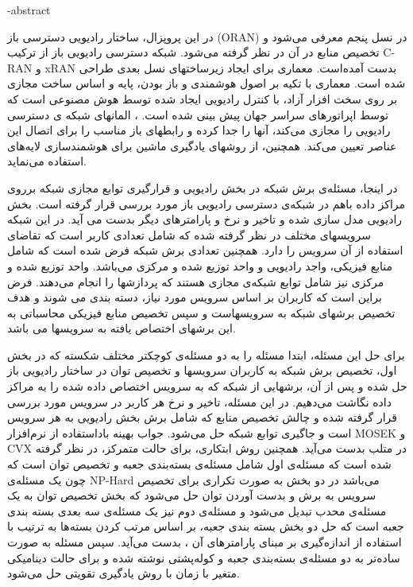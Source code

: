 \fa-abstract{
در این پروپزال، ساختار رادیویی دسترسی باز (ORAN) در نسل پنجم معرفی می‌شود و تخصیص منابع در آن در نظر گرفته می‌شود.
شبکه دسترسی رادیویی باز از ترکیب C-RAN و xRAN بدست آمده‌است. معماری  برای ایجاد زیرساختهای  نسل بعدی طراحی شده است.
معماری  با تکیه بر اصول هوشمندی و باز بودن، پایه و اساس ساخت  مجازی بر روی سخت افزار آزاد، با کنترل رادیویی ایجاد شده توسط هوش مصنوعی است که توسط اپراتورهای سراسر جهان پیش بینی شده است.
،
المانهای شبکه ی دسترسی رادیویی را مجازی می‌کند، آنها را جدا کرده و رابطهای باز مناسب را 
برای اتصال این عناصر
تعیین می‌کند. همچنین، 
از روشهای یادگیری ماشین برای هوشمندسازی لایه‌های 
استفاده می‌نماید.

در اینجا، مسئله‌ی برش شبکه در بخش رادیویی و قرارگیری توابع مجازی شبکه برروی مراکز داده باهم در شبکه‌ی دسترسی رادیویی باز مورد بررسی قرار گرفته است. 
بخش رادیویی
 مدل سازی شده و تاخیر و نرخ و پارامترهای دیگر بدست می آید. 
در این شبکه سرویسهای مختلف در نظر گرفته شده که شامل تعدادی کاربر است که تقاضای استفاده از آن سرویس را دارد. همچنین تعدادی برش شبکه فرض شده است که شامل منابع فیزیکی، واجد رادیویی و واحد توزیع شده و مرکزی می‌باشد. واحد توزیع شده و مرکزی نیز شامل توابع شبکه‌ی مجازی هستند که پردازشها را انجام می‌دهند.
فرض براین است که کاربران بر اساس سرویس مورد نیاز، دسته بندی می شوند و هدف تخصیص برشهای شبکه به سرویسهاست و سپس تخصیص منابع فیزیکی محاسباتی به این برشهای اختصاص یافته به سرویسها می باشد.
 
برای حل این مسئله، ابتدا مسئله را به دو مسئله‌ی کوچکتر مختلف شکسته که در بخش اول، تخصیص برش شبکه به کاربران سرویسها و تخصیص توان در ساختار رادیویی باز حل شده و پس از آن، برشهایی از شبکه که به سرویس اختصاص داده شده را به مراکز داده نگاشت می‌دهیم.
در این مسئله، تاخیر و نرخ هر کاربر در سرویس مورد بررسی قرار گرفته شده و چالش تخصیص منابع که شامل برش بخش رادیویی به هر سرویس است و جاگیری توابع شبکه حل می‌شود.
جواب بهینه باداستفاده از نرم‌افزار MOSEK و CVX در متلب بدست می‌آید. همچنین روش ابتکاری، برای حالت متمرکز، در نظر گرفته شده است که مسئله‌ی اول شامل مسئله‌ی بسته‌بندی جعبه و تخصیص توان است که چون یک مسئله‌ی NP-Hard می‌باشد در دو بخش به صورت تکراری برای تخصیص سرویس به برش و بدست آوردن توان حل می‌شود که بخش تخصیص توان به یک مسئله‌ی محدب تبدیل می‌شود و مسئله‌ی دوم نیز یک مسئله‌ی سه بعدی بسته بندی جعبه است که حل دو بخش بسته بندی جعبه، بر اساس مرتب کردن بسته‌ها به ترتیب با استفاده از اندازه‌گیری بر مبنای پارامترهای آن \cite{3dbin}، بدست می‌آید.
سپس مسئله به صورت ساده‌تر به دو مسئله‌ی بسته‌بندی جعبه و کوله‌پشتی نوشته شده و برای حالت دینامیکی متغیر با زمان با روش یادگیری تقویتی حل می‌شود.
}
